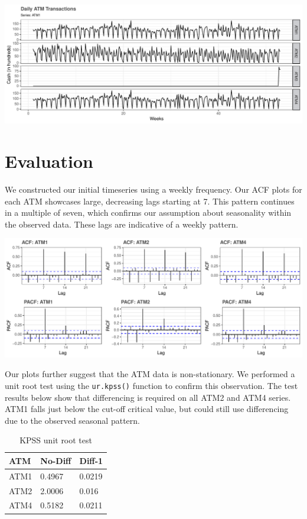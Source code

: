 \documentclass[openany]{book}
\begin{document}
\includegraphics{Part-A-JM_files/figure-latex/unnamed-chunk-3-1.pdf}

\hypertarget{evaluation}{%
\section{Evaluation}\label{evaluation}}

We constructed our initial timeseries using a weekly frequency. Our ACF
plots for each ATM showcases large, decreasing lags starting at 7. This
pattern continues in a multiple of seven, which confirms our assumption
about seasonality within the observed data. These lags are indicative of
a weekly pattern.

\includegraphics{Part-A-JM_files/figure-latex/unnamed-chunk-4-1.pdf}

Our plots further suggest that the ATM data is non-stationary. We
performed a unit root test using the \texttt{ur.kpss()} function to
confirm this observation. The test results below show that differencing
is required on all ATM2 and ATM4 series. ATM1 falls just below the
cut-off critical value, but could still use differencing due to the
observed seasonal pattern.

\begin{table}[H]

\caption{\label{tab:unnamed-chunk-5}KPSS unit root test}
\centering
\begin{tabular}{l|l|l}
\hline
\textbf{ATM} & \textbf{No-Diff} & \textbf{Diff-1}\\
\hline
\rowcolor{gray!6}  ATM1 & 0.4967 & 0.0219\\
\hline
ATM2 & 2.0006 & 0.016\\
\hline
\rowcolor{gray!6}  ATM4 & 0.5182 & 0.0211\\
\hline
\end{tabular}
\end{table}
\end{document}
